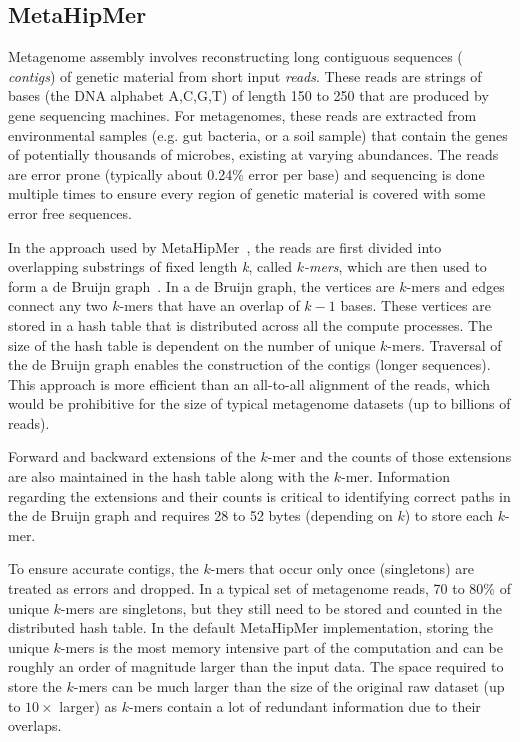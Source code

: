 \subsection{MetaHipMer}

Metagenome assembly involves reconstructing long contiguous sequences ({\it
contigs}) of genetic material from short input {\it reads}. These reads are
strings of bases (the DNA alphabet A,C,G,T) of length 150 to 250 that are
produced by gene sequencing machines.  For metagenomes, these reads are
extracted from environmental samples (e.g. gut bacteria, or a soil sample) that
contain the genes of potentially thousands of microbes, existing at varying
abundances.  The reads are error prone (typically about 0.24\% error per base)
and sequencing is done multiple times to ensure every region of genetic material
is covered with some error free sequences.

In the approach used by MetaHipMer~\cite{GeorganasEHG18,HofmeyrEGC20}, the reads are first divided into overlapping
substrings of fixed length {\it k}, called {\it $k$-mers}, which are then used
to form a de Bruijn graph~\cite{CompeauPeTe11}. In a de Bruijn graph, the
vertices are $k$-mers and edges connect any two $k$-mers that have an overlap of
$k-1$ bases. These vertices are stored in a hash table that is distributed
across all the compute processes.  The size of the hash table is dependent on
the number of unique $k$-mers.  Traversal of the de Bruijn graph enables the
construction of the contigs (longer sequences).  This approach is more efficient
than an all-to-all alignment of the reads, which would be prohibitive for the
size of typical metagenome datasets (up to billions of reads).

Forward and backward extensions of the $k$-mer and the counts of those
extensions are also maintained in the hash table along with the $k$-mer.
Information regarding the extensions and their counts is critical to identifying
correct paths in the de Bruijn graph and requires 28 to 52 bytes (depending on
$k$) to store each $k$-mer.

To ensure accurate contigs, the $k$-mers that occur only once (singletons) are
treated as errors and dropped. In a typical set of metagenome reads, 70 to 80\%
of unique $k$-mers are singletons, but they still need to be stored and counted
in the distributed hash table. In the default MetaHipMer implementation, storing
the unique $k$-mers is the most memory intensive part of the computation and can
be roughly an order of magnitude larger than the input data.  The space required
to store the $k$-mers can be much larger than the size of the original raw
dataset (up to $10\times$ larger) as $k$-mers contain a lot of redundant
information due to their overlaps.

